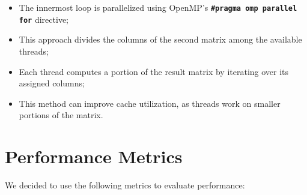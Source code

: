 \documentclass{article}
\begin{document}
\begin{itemize}
\item The innermost loop is parallelized using OpenMP's \textbf{\lstinline{#pragma omp parallel for}} directive;
\item This approach divides the columns of the second matrix among the available threads;
\item Each thread computes a portion of the result matrix by iterating over its assigned columns;
\item This method can improve cache utilization, as threads work on smaller portions of the matrix.
\end{itemize}

\section{Performance Metrics}

We decided to use the following metrics to evaluate performance:
\end{document}
